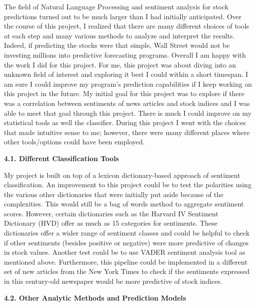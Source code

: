 \documentclass{acm_proc_article-sp}
\begin{document}
The field of Natural Language Processing and sentiment analysis for stock predictions turned out to be much larger than I had initially anticipated. Over the course of this project, I realized that there are many different choices of tools at each step and many various methods to analyze and interpret the results. Indeed, if predicting the stocks were that simple, Wall Street would not be investing millions into predictive forecasting programs. Overall I am happy with the work I did for this project. For me, this project was about diving into an unknown field of interest and exploring it best I could within a short timespan. I am sure I could improve my program's prediction capabilities if I keep working on this project in the future. My initial goal for this project was to explore if there was a correlation between sentiments of news articles and stock indices and I was able to meet that goal through this project. There is much I could improve on my statistical tools as well the classifier. During this project I went with the choices that made intuitive sense to me; however, there were many different places where other tools/options could have been employed.

\textbf{4.1. Different Classification Tools}


My project is built on top of a lexicon dictionary-based approach of sentiment classification.  An improvement to this project could be to test the polarities using the various other dictionaries that were initially put aside because of the complexities. This would still be a bag of words method to aggregate sentiment scores. However, certain dictionaries such as the Harvard IV Sentiment Dictionary (HVD) offer as much as 15 categories for sentiments. These dictionaries offer a wider range of sentiment classes and could be helpful to check if other sentiments (besides positive or negative) were more predictive of changes in stock values. Another test could be to use VADER sentiment analysis tool as mentioned above. Furthermore, this pipeline could be implemented in a different set of new articles from the New York Times to check if the sentiments expressed in this century-old newspaper would be more predictive of stock indices.

\textbf{4.2. Other Analytic Methods and Prediction Models}
\end{document}
